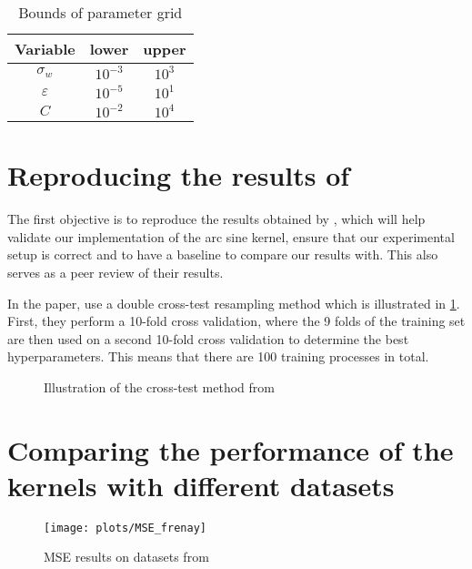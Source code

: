\begin{table}[H]
    \caption{Bounds of parameter grid}%
    \label{tab:paramgrid}
    \begin{tabular}{ccc}
        \toprule
        Variable & lower & upper \\
        \midrule
        $\sigma_w$ & $10^{-3}$ & $10^3$ \\
        $\varepsilon$ & $10^{-5}$ & $10^1$ \\
        $C$ & $10^{-2}$ & $10^4$ \\
        \bottomrule
    \end{tabular}
\end{table}

\section{Reproducing the results of \texorpdfstring{\citeauthor{frenayParameterinsensitiveKernelExtreme2011}}{Frénay and Verleysen}}
\label{sec:reproducing-frenay}

The first objective is to reproduce the results obtained by \textcite{frenayParameterinsensitiveKernelExtreme2011},
which will help validate our implementation of the arc sine kernel, ensure that our experimental setup is
correct and to have a baseline to compare our results with. This also serves as a peer review
of their results.

In the paper, \citeauthor{frenayParameterinsensitiveKernelExtreme2011} use a double cross-test resampling
method which is illustrated in \cref{fig:frenay-cross-test}. First, they perform a 10-fold cross validation,
where the 9 folds of the training set are then used on a second 10-fold cross validation to determine the
best hyperparameters. This means that there are 100 training processes in total.

\begin{figure}[H]
    
	\caption{Illustration of the cross-test method from \cite{frenayParameterinsensitiveKernelExtreme2011}}
	\label{fig:frenay-cross-test}
\end{figure}

\section{Comparing the performance of the kernels with different datasets}%

\begin{figure}
    \texttt{[image: plots/MSE\_frenay]}
    \caption{MSE results on datasets from \cite{frenayParameterinsensitiveKernelExtreme2011}}
\end{figure}


